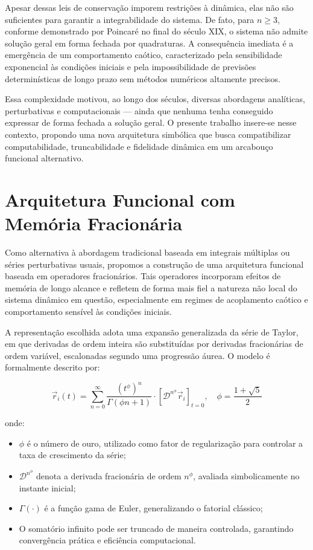 \documentclass[12pt]{article}
\begin{document}
Apesar dessas leis de conservação imporem restrições à dinâmica, elas não são suficientes para garantir a integrabilidade do sistema. De fato, para \( n \geq 3 \), conforme demonstrado por Poincaré no final do século XIX, o sistema não admite solução geral em forma fechada por quadraturas. A consequência imediata é a emergência de um comportamento caótico, caracterizado pela sensibilidade exponencial às condições iniciais e pela impossibilidade de previsões determinísticas de longo prazo sem métodos numéricos altamente precisos.

Essa complexidade motivou, ao longo dos séculos, diversas abordagens analíticas, perturbativas e computacionais — ainda que nenhuma tenha conseguido expressar de forma fechada a solução geral. O presente trabalho insere-se nesse contexto, propondo uma nova arquitetura simbólica que busca compatibilizar computabilidade, truncabilidade e fidelidade dinâmica em um arcabouço funcional alternativo.


\section{Arquitetura Funcional com Memória Fracionária}

Como alternativa à abordagem tradicional baseada em integrais múltiplas ou séries perturbativas usuais, propomos a construção de uma arquitetura funcional baseada em operadores fracionários. Tais operadores incorporam efeitos de memória de longo alcance e refletem de forma mais fiel a natureza não local do sistema dinâmico em questão, especialmente em regimes de acoplamento caótico e comportamento sensível às condições iniciais.

A representação escolhida adota uma expansão generalizada da série de Taylor, em que derivadas de ordem inteira são substituídas por derivadas fracionárias de ordem variável, escalonadas segundo uma progressão áurea. O modelo é formalmente descrito por:

\[
\vec{r}_i(t) = \sum_{n=0}^{\infty} \frac{(t^\phi)^n}{\Gamma(\phi n + 1)} \cdot \left[ \mathcal{D}^{n^\phi} \vec{r}_i \right]_{t=0}, \quad \phi = \frac{1 + \sqrt{5}}{2}
\]

onde:
\begin{itemize}
    \item \( \phi \) é o número de ouro, utilizado como fator de regularização para controlar a taxa de crescimento da série;
    \item \( \mathcal{D}^{n^\phi} \) denota a derivada fracionária de ordem \( n^\phi \), avaliada simbolicamente no instante inicial;
    \item \( \Gamma(\cdot) \) é a função gama de Euler, generalizando o fatorial clássico;
    \item O somatório infinito pode ser truncado de maneira controlada, garantindo convergência prática e eficiência computacional.
\end{itemize}
\end{document}
